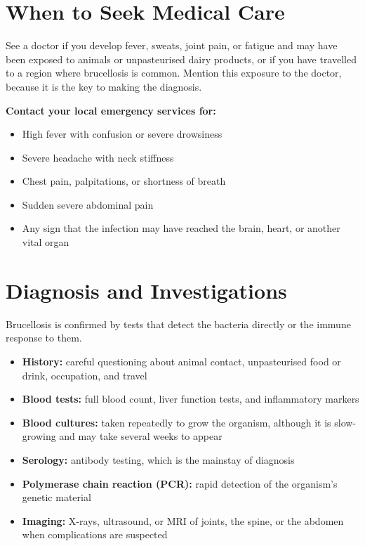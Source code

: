 \section*{When to Seek Medical Care}
See a doctor if you develop fever, sweats, joint pain, or fatigue and may have been exposed to animals or unpasteurised dairy products, or if you have travelled to a region where brucellosis is common. Mention this exposure to the doctor, because it is the key to making the diagnosis.

\textbf{Contact your local emergency services for:}
\begin{itemize}
    \item High fever with confusion or severe drowsiness
    \item Severe headache with neck stiffness
    \item Chest pain, palpitations, or shortness of breath
    \item Sudden severe abdominal pain
    \item Any sign that the infection may have reached the brain, heart, or another vital organ
\end{itemize}

\section*{Diagnosis and Investigations}
Brucellosis is confirmed by tests that detect the bacteria directly or the immune response to them.

\begin{itemize}
    \item \textbf{History:} careful questioning about animal contact, unpasteurised food or drink, occupation, and travel
    \item \textbf{Blood tests:} full blood count, liver function tests, and inflammatory markers
    \item \textbf{Blood cultures:} taken repeatedly to grow the organism, although it is slow-growing and may take several weeks to appear
    \item \textbf{Serology:} antibody testing, which is the mainstay of diagnosis
    \item \textbf{Polymerase chain reaction (PCR):} rapid detection of the organism's genetic material
    \item \textbf{Imaging:} X-rays, ultrasound, or MRI of joints, the spine, or the abdomen when complications are suspected
\end{itemize}

